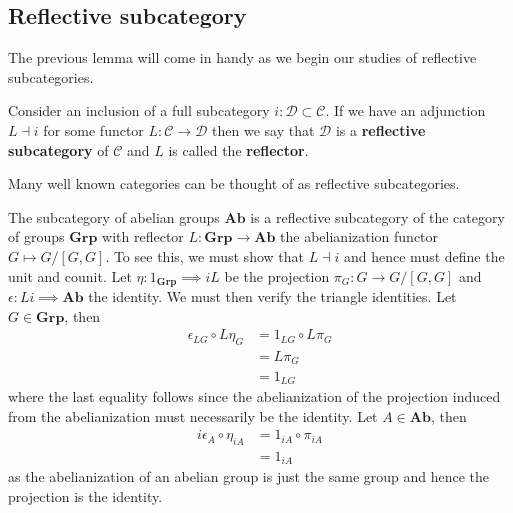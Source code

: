 \subsection{Reflective subcategory} %
\label{sub:Reflective subcategories}
The previous lemma will come in handy as we begin our studies of reflective subcategories.
\begin{definition}
Consider an inclusion of a full subcategory $ i: \mathcal{D} \subset \mathcal{C} $. If we have an adjunction $ L \dashv i $ for some functor $ L: \mathcal{C} \to \mathcal{D} $ then we say that $ \mathcal{D} $ is a \textbf{reflective subcategory} of $ \mathcal{C} $ and $ L $ is called the \textbf{reflector}.
\end{definition}

Many well known categories can be thought of as reflective subcategories.

\begin{example}
  \label{ex:ab}
  The subcategory of abelian groups $ \mathbf{Ab} $ is a reflective subcategory of the category of groups $ \mathbf{Grp} $ with reflector $ L:\mathbf{Grp} \to \mathbf{Ab} $ the abelianization functor $ G \mapsto G/[G,G] $. To see this, we must show that $ L \dashv i $ and hence must define the unit and counit. Let $ \eta: 1_{\mathbf{Grp}} \implies iL $ be the projection $ \pi_G: G \to G/[G,G] $ and
  $ \epsilon: Li \implies \mathbf{Ab} $ the identity. We must then verify the triangle identities. Let $ G \in \mathbf{Grp} $, then
  \begin{align*}
    \epsilon_{LG} \circ L\eta_G &= 1_{LG} \circ L\pi_G \\
                                &= L\pi_G \\
                                &= 1_{LG}
  \end{align*}
  where the last equality follows since the abelianization of the projection induced from the abelianization must necessarily be the identity. Let $ A \in \mathbf{Ab} $, then
  \begin{align*}
    i\epsilon_A \circ \eta_{iA} &= 1_{iA} \circ \pi_{iA} \\
                                &= 1_{iA}
  \end{align*}
  as the abelianization of an abelian group is just the same group and hence the projection is the identity.
\end{example}

